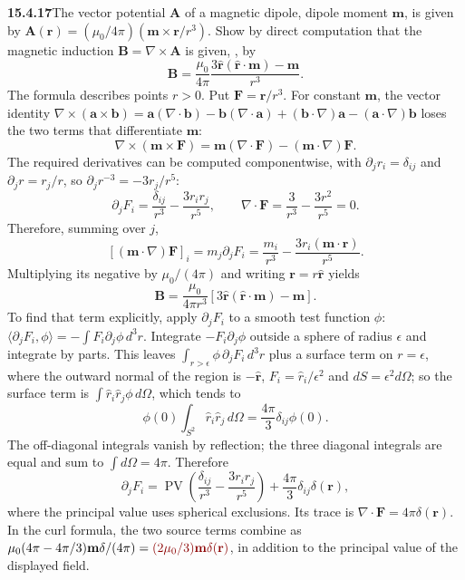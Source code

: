 \par\bigskip
\noindent\textbf{15.4.17}\quad The vector potential $\mathbf{A}$ of a
magnetic dipole, dipole moment $\mathbf{m}$, is given by
$\mathbf{A}(\mathbf{r})=(\mu_{0}/4\pi)(\mathbf{m}\times\mathbf{r}/r^{3})$.
Show by direct computation that the magnetic induction
$\mathbf{B}=\nabla\times\mathbf{A}$ is given, , by
\[
\mathbf{B}=\frac{\mu_{0}}{4\pi}
\frac{3\hat{\mathbf{r}}(\hat{\mathbf{r}}\cdot\mathbf{m})-\mathbf{m}}{r^{3}}.
\]
\solution
The formula describes points $r>0$. Put $\mathbf F=\mathbf r/r^3$.
For constant $\mathbf m$, the vector identity
$\nabla\times(\mathbf a\times\mathbf b)=\mathbf a(\nabla\cdot\mathbf b)
-\mathbf b(\nabla\cdot\mathbf a)+(\mathbf b\cdot\nabla)\mathbf a
-(\mathbf a\cdot\nabla)\mathbf b$ loses the two terms that
differentiate $\mathbf m$:
\[
\nabla\times(\mathbf m\times\mathbf F)
=\mathbf m(\nabla\cdot\mathbf F)-(\mathbf m\cdot\nabla)\mathbf F.
\]
The required derivatives can be computed componentwise, with
$\partial_jr_i=\delta_{ij}$ and $\partial_jr=r_j/r$, so
$\partial_jr^{-3}=-3r_j/r^5$:
\[
\partial_jF_i=\frac{\delta_{ij}}{r^3}-\frac{3r_ir_j}{r^5},
\qquad
\nabla\cdot\mathbf F=\frac3{r^3}-\frac{3r^2}{r^5}=0.
\]
Therefore, summing over $j$,
\[
[(\mathbf m\cdot\nabla)\mathbf F]_i=m_j\partial_jF_i
=\frac{m_i}{r^3}-\frac{3r_i(\mathbf m\cdot\mathbf r)}{r^5}.
\]
Multiplying its negative by $\mu_0/(4\pi)$ and writing
$\mathbf r=r\hat{\mathbf r}$ yields
\[
\boxed{\mathbf B=
\frac{\mu_0}{4\pi r^3}
[3\hat{\mathbf r}(\hat{\mathbf r}\cdot\mathbf m)-\mathbf m]}.
\]
 To find that term explicitly, apply
$\partial_jF_i$ to a smooth test function $\phi$:
$\langle\partial_jF_i,\phi\rangle=-\int F_i\partial_j\phi\,d^3r$.
Integrate $-F_i\partial_j\phi$ outside a sphere of radius $\epsilon$
and integrate by parts. This leaves $\int_{r>\epsilon}\phi\,\partial_jF_i\,d^3r$
plus a surface term on $r=\epsilon$, where the outward normal of the
region is $-\hat{\mathbf r}$, $F_i=\hat r_i/\epsilon^2$ and
$dS=\epsilon^2d\Omega$; so the surface term is
$\int\hat r_i\hat r_j\phi\,d\Omega$, which tends to
\[
\phi(0)\int_{S^2}\hat r_i\hat r_j\,d\Omega
=\frac{4\pi}{3}\delta_{ij}\phi(0).
\]
The off-diagonal integrals vanish by reflection; the three diagonal
integrals are equal and sum to $\int d\Omega=4\pi$. Therefore
\[
\partial_jF_i=\operatorname{PV}\!\left(
\frac{\delta_{ij}}{r^3}-\frac{3r_ir_j}{r^5}\right)
+\frac{4\pi}{3}\delta_{ij}\delta(\mathbf r),
\]
where the principal value uses spherical exclusions. Its trace is
$\nabla\cdot\mathbf F=4\pi\delta(\mathbf r)$. In the curl formula,
the two source terms combine as
$\mu_0(4\pi-4\pi/3)\mathbf m\delta/(4\pi)
=\erratum{(2\mu_0/3)\mathbf m\delta(\mathbf r)}$, in addition
to the principal value of the displayed field.

